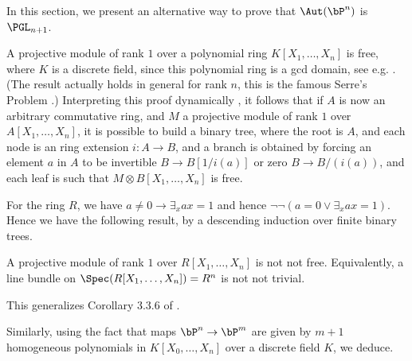 In this section, we present an alternative way to prove that   $\Aut(\bP^n)$ is $\PGL_{n+1}$.

A projective module of rank $1$ over a polynomial
ring $K[X_1,\dots,X_n]$ is free, where $K$ is a discrete field, since this polynomial ring is a gcd domain, see
e.g. \cite{seminormal}. (The result actually holds in general
for rank $n$, this is the famous Serre's Problem \cite{Lam}.) Interpreting this proof dynamically
\cite{lombardi-quitte}, it follows that if $A$ is now an arbitrary commutative ring, and $M$ a
projective module of rank $1$ over $A[X_1,\dots,X_n]$, it is possible to build a binary tree, where
the root is $A$, and each node is an ring extension $i:A\rightarrow B$, and a branch is obtained
by forcing an element $a$ in $A$ to be invertible $B\rightarrow B[1/i(a)]$ or zero $B\rightarrow B/(i(a))$,
and each leaf is such that $M\otimes B[X_1,\dots,X_n]$ is free.

For the ring $R$, we have $a\neq 0\rightarrow \exists_x ax=1$ and hence $\neg \neg (a=0\vee \exists_x a x=1)$.
Hence we have the following result, by a descending induction over finite binary trees.

\begin{lemma}\label{notnot}
  A projective module of rank $1$ over $R[X_1,\dots,X_n]$ is not not free. Equivalently, 
a line bundle on $\Spec(R[X_1,\dots,X_n]) = R^n$ is not not trivial.
\end{lemma}

This generalizes Corollary 3.3.6 of \cite{draft}.



Similarly, using the fact that maps $\bP^n\rightarrow \bP^m$ are given by $m+1$ homogeneous polynomials in $K[X_0,\dots,X_n]$
over a discrete field $K$, we deduce.


